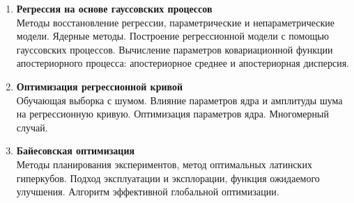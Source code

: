 \documentclass[12pt,oneside,openany]{article}
\begin{document}
\begin{enumerate}
  \item \textbf{Регрессия на основе гауссовских процессов} \\
  Методы восстановление регрессии, параметрические и непараметрические модели. Ядерные методы. Построение регрессионной модели с помощью гауссовских процессов. Вычисление параметров ковариационной функции апостериорного процесса: апостериорное среднее и апостериорная дисперсия.

  \item \textbf{Оптимизация регрессионной кривой} \\
  Обучающая выборка с шумом. Влияние параметров ядра и амплитуды шума на регрессионную кривую. Оптимизация параметров ядра. Многомерный случай.

  \item \textbf{Байесовская оптимизация} \\
  Методы планирования экспериментов, метод оптимальных латинских гиперкубов. Подход эксплуатации и эксплорации, функция ожидаемого улучшения. Алгоритм эффективной глобальной оптимизации.

\end{enumerate}
\end{document}
